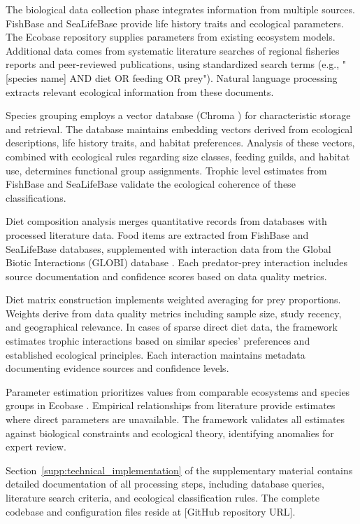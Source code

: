 The biological data collection phase integrates information from multiple sources. FishBase and SeaLifeBase \citep{froese2010fishbase} provide life history traits and ecological parameters. The Ecobase repository \citep{Colleter2015} supplies parameters from existing ecosystem models. Additional data comes from systematic literature searches of regional fisheries reports and peer-reviewed publications, using standardized search terms (e.g., "[species name] AND diet OR feeding OR prey"). Natural language processing extracts relevant ecological information from these documents.

Species grouping employs a vector database (Chroma \citep{Chroma2024}) for characteristic storage and retrieval. The database maintains embedding vectors derived from ecological descriptions, life history traits, and habitat preferences. Analysis of these vectors, combined with ecological rules regarding size classes, feeding guilds, and habitat use, determines functional group assignments. Trophic level estimates from FishBase and SeaLifeBase \citep{froese2010fishbase} validate the ecological coherence of these classifications.

Diet composition analysis merges quantitative records from databases with processed literature data. Food items are extracted from FishBase and SeaLifeBase \citep{froese2010fishbase} databases, supplemented with interaction data from the Global Biotic Interactions (GLOBI) database \citep{Poelen2014}. Each predator-prey interaction includes source documentation and confidence scores based on data quality metrics.

Diet matrix construction implements weighted averaging for prey proportions. Weights derive from data quality metrics including sample size, study recency, and geographical relevance. In cases of sparse direct diet data, the framework estimates trophic interactions based on similar species' preferences and established ecological principles. Each interaction maintains metadata documenting evidence sources and confidence levels.

Parameter estimation prioritizes values from comparable ecosystems and species groups in Ecobase \citep{Colleter2015}. Empirical relationships from literature provide estimates where direct parameters are unavailable. The framework validates all estimates against biological constraints and ecological theory, identifying anomalies for expert review.

Section~\ref{supp:technical_implementation} of the supplementary material contains detailed documentation of all processing steps, including database queries, literature search criteria, and ecological classification rules. The complete codebase and configuration files reside at [GitHub repository URL].
